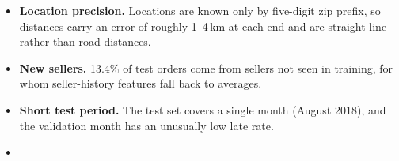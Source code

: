 
\begin{itemize}
    \item \textbf{Location precision.} Locations are known only by five-digit
    zip prefix, so distances carry an error of roughly 1--4\,km at each end and
    are straight-line rather than road distances.
    \item \textbf{New sellers.} 13.4\% of test orders come from sellers not
    seen in training, for whom seller-history features fall back to averages.
    \item \textbf{Short test period.} The test set covers a single month
    (August 2018), and the validation month has an unusually low late rate.
    \item {}
\end{itemize}
